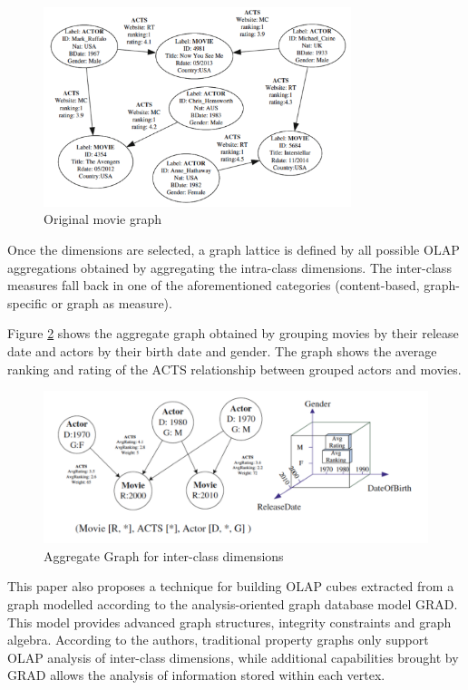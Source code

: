 \begin{figure}[ht]
\centering
\includegraphics[width=0.8\textwidth]{../movie_graph.png}
\caption{Original movie graph \cite{ghrab2015framework}}
\label{fig:figure21}
\end{figure}

Once the dimensions are selected, a graph lattice is defined by all possible OLAP aggregations obtained by aggregating the intra-class dimensions. The inter-class measures fall back in one of the aforementioned categories (content-based,  graph-specific or graph as measure).

Figure \ref{fig:figure22} shows the aggregate graph obtained by grouping movies by their release date and actors by their birth date and gender. The graph shows the average ranking and rating of the ACTS relationship between grouped actors and movies.

\begin{figure}[ht]
\centering
\includegraphics[width=1\textwidth]{../interclass_dimension.png}
\caption{Aggregate Graph for inter-class dimensions \cite{ghrab2015framework}}
\label{fig:figure22}
\end{figure}

This paper also proposes a technique for building OLAP cubes extracted from a graph modelled according to the analysis-oriented graph database model GRAD. This model provides advanced graph structures, integrity constraints and graph algebra. According to the authors, traditional property graphs only support OLAP analysis of inter-class dimensions, while additional capabilities brought by GRAD allows the analysis of information stored within each vertex.
 
